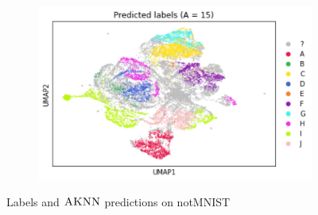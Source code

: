 \documentclass{article}
\newcommand{\algname}{\textsc{AKNN}}
\begin{document}
\begin{figure}
\begin{subfigure}[t]{0.34\textwidth}
        \includegraphics[width=\linewidth]{figs/notMNIST_preds_Aeq15.png} %
    \end{subfigure}
  \caption{Labels and $\algname$ predictions on notMNIST}
  \label{fig:varyingparam}
\end{figure}
\end{document}
